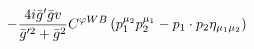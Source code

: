 %
\begin{dmath*}
%
  -  \frac{4 i {\bar g}^\prime {\bar g}{} v}{{\bar g}^{\prime 2} + {\bar g}{}^2}C^{ \varphi  WB} \left(p_1^{\mu_2} p_2^{\mu_1} - p_{1}\nobreak\cdot\nobreak{}p_{2} \eta_{\mu_1 \mu_2}\right)
%
\end{dmath*}
%
